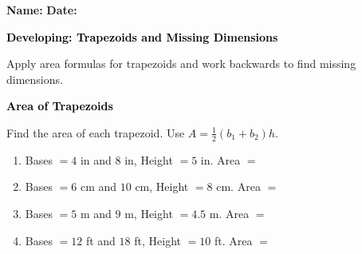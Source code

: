 \documentclass[12pt, letterpaper, fleqn]{article}
\newcommand{\blank}{\underline{\hspace{2.2cm}}}
\begin{document}
\textbf{Name:} \underline{\hspace{5cm}}
\hfill
\textbf{Date:} \underline{\hspace{3cm}}\\

\begin{tcolorbox}[colback=black!10]
    \large\textcolor{black}{\textbf{Developing: Trapezoids and Missing Dimensions}}
\end{tcolorbox}

\vspace{3mm}

\noindent
Apply area formulas for trapezoids and work backwards to find missing dimensions.

\vspace{4mm}

\begin{tcolorbox}[colback=black!10]
\large\textcolor{black}{\textbf{Area of Trapezoids}}
\end{tcolorbox}

\noindent
Find the area of each trapezoid. Use $A = \frac{1}{2}(b_1 + b_2)h$.

\vspace{3mm}

\begin{enumerate}[itemsep=1.5cm, leftmargin=0.6cm]

\item Bases $= 4$ in and $8$ in, Height $= 5$ in. \quad Area $=$ \blank

\vspace{1.5cm}

\item Bases $= 6$ cm and $10$ cm, Height $= 8$ cm. \quad Area $=$ \blank

\vspace{1.5cm}

\item Bases $= 5$ m and $9$ m, Height $= 4.5$ m. \quad Area $=$ \blank

\vspace{1.5cm}

\item Bases $= 12$ ft and $18$ ft, Height $= 10$ ft. \quad Area $=$ \blank

\vspace{1.5cm}

\end{enumerate}
\end{document}
